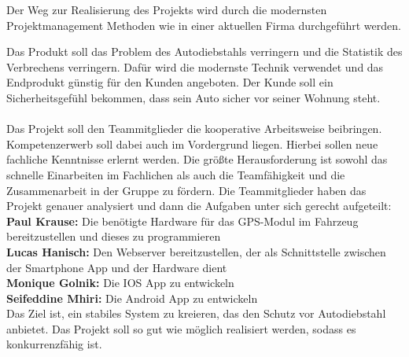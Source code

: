 Der Weg zur Realisierung des Projekts wird durch die modernsten Projektmanagement Methoden wie in einer aktuellen Firma durchgeführt werden.




Das Produkt soll das Problem des Autodiebstahls verringern und die Statistik des Verbrechens verringern. Dafür wird die modernste Technik verwendet und das Endprodukt günstig für den Kunden angeboten.
Der Kunde soll ein Sicherheitsgefühl bekommen, dass sein Auto sicher vor seiner Wohnung steht.\\\\
Das Projekt soll den Teammitglieder die kooperative Arbeitsweise beibringen.
Kompetenzerwerb soll dabei auch im Vordergrund liegen. Hierbei sollen neue fachliche Kenntnisse erlernt werden.
Die größte Herausforderung ist sowohl das schnelle Einarbeiten im Fachlichen als auch die Teamfähigkeit und die Zusammenarbeit in der Gruppe zu fördern.
Die Teammitglieder haben das Projekt genauer analysiert und dann die Aufgaben unter sich gerecht aufgeteilt:\\
\textbf{Paul Krause:} Die benötigte Hardware für das GPS-Modul im Fahrzeug bereitzustellen und dieses zu programmieren\\
\textbf{Lucas Hanisch:} Den Webserver bereitzustellen, der als Schnittstelle zwischen der Smartphone App und der Hardware dient\\
\textbf{Monique Golnik:} Die IOS App zu entwickeln\\
\textbf{Seifeddine Mhiri:} Die Android App zu entwickeln\\
Das Ziel ist, ein stabiles System zu kreieren, das den Schutz vor Autodiebstahl anbietet. Das Projekt soll so gut wie möglich realisiert werden, sodass es konkurrenzfähig ist.



